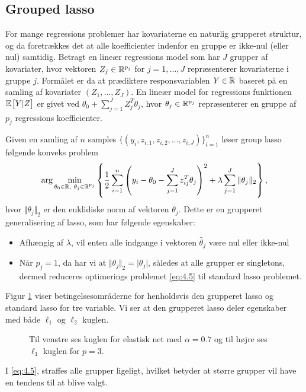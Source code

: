 \subsection{Grouped lasso}
For mange regressions problemer har kovariaterne en naturlig grupperet struktur, og da foretrækkes det at alle koefficienter indenfor en gruppe er ikke-nul (eller nul) samtidig.
Betragt en lineær regressions model som har $J$ grupper af kovariater, hvor vektoren $Z_j \in \mathbb{R}^{p_j}$ for $j=1, \ldots, J$ repræsenterer kovariaterne i gruppe $j$.
Formålet er da at prædiktere responsvariablen $Y \in \mathbb{R}$ baseret på en samling af kovariater $(Z_1,\ldots,Z_J)$.
En lineær model for regressions funktionen $\E{Y \vert Z}$ er givet ved \(\theta_0 + \sum_{j=1}^J Z_j^T \theta_j\), hvor $\theta_j \in \mathbb{R}^{p_j}$ repræsenterer en gruppe af $p_j$ regressions koefficienter. 

Given en samling af $n$ samples \(\{(y_i, z_{i,1}, z_{i,2}, \ldots, z_{i,J})\}_{i=1}^n\) løser group lasso følgende konveks problem
\begin{align}
\arg \min_{\theta_0 \in \R, \ \theta_j \in \R^{p_j}} \cbr{\frac{1}{2} \sum_{i=1}^n \del{y_i - \theta_0 - \sum_{j=1}^J z_{ij}^T \theta_j}^2 + \lambda \sum_{j=1}^J \Vert \theta_j \Vert_2},\label{eq:4.5}
\end{align}
hvor $\Vert \theta_j \Vert_2$ er den euklidiske norm af vektoren $\theta_j$.
Dette er en grupperet generalisering af lasso, som har følgende egenskaber:
\begin{itemize}
\item Afhængig af $\lambda$, vil enten alle indgange i vektoren $\hat{\theta}_j$ være nul eller ikke-nul
\item Når $p_j=1$, da har vi at $\Vert \theta_j \Vert_2 = \vert \theta_j \vert$, således at alle grupper er singletons, dermed reduceres optimerings problemet \eqref{eq:4.5} til standard lasso problemet.
\end{itemize}
Figur \ref{fig:elastisk_net} viser betingelsesområderne for henholdsvis den grupperet lasso og standard lasso for tre variable.
Vi ser at den grupperet lasso deler egenskaber med både $\ell_1$ og $\ell_2$ kuglen.
%
\begin{figure}[H]
\centering
\caption{Til venstre ses kuglen for elastisk net med \(\alpha=0.7\) og til højre ses \(\ell_1\) kuglen for \(p=3\).}
\label{fig:elastisk_net}
\end{figure}
%
I \eqref{eq:4.5}, straffes alle grupper ligeligt, hvilket betyder at større grupper vil have en tendens til at blive valgt.


